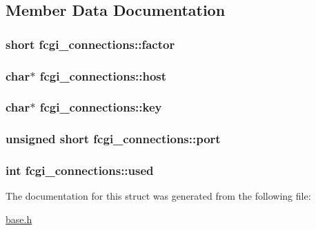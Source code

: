 \subsection{Member Data Documentation}
\hypertarget{structfcgi__connections_a94d4268a4c6b52356854e3804d7638f6}{
\subsubsection[{factor}]{\setlength{\rightskip}{0pt plus 5cm}short fcgi\-\_\-connections\-::factor}}\label{structfcgi__connections_a94d4268a4c6b52356854e3804d7638f6}
\hypertarget{structfcgi__connections_acb12a28d6dd9ed9a65e58d55989f4b5c}{
\subsubsection[{host}]{\setlength{\rightskip}{0pt plus 5cm}char$\ast$ fcgi\-\_\-connections\-::host}}\label{structfcgi__connections_acb12a28d6dd9ed9a65e58d55989f4b5c}
\hypertarget{structfcgi__connections_a3d3c1dfc85657caf413d5ff78d24c7f8}{
\subsubsection[{key}]{\setlength{\rightskip}{0pt plus 5cm}char$\ast$ fcgi\-\_\-connections\-::key}}\label{structfcgi__connections_a3d3c1dfc85657caf413d5ff78d24c7f8}
\hypertarget{structfcgi__connections_a5c37209105fad85c06a7c75163617360}{
\subsubsection[{port}]{\setlength{\rightskip}{0pt plus 5cm}unsigned short fcgi\-\_\-connections\-::port}}\label{structfcgi__connections_a5c37209105fad85c06a7c75163617360}
\hypertarget{structfcgi__connections_ae7ca640a3e5e7d35ed55623e46d3e9c9}{
\subsubsection[{used}]{\setlength{\rightskip}{0pt plus 5cm}int fcgi\-\_\-connections\-::used}}\label{structfcgi__connections_ae7ca640a3e5e7d35ed55623e46d3e9c9}


The documentation for this struct was generated from the following file\-:\begin{DoxyCompactItemize}
\item 
\hyperlink{base_8h}{base.\-h}\end{DoxyCompactItemize}
